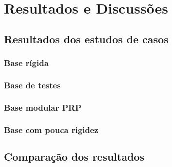 \chapter{Resultados e Discussões}



\section{Resultados dos estudos de casos}

\subsection{Base rígida}

\subsection{Base de testes}

\subsection{Base modular PRP}

\subsection{Base com pouca rigidez}


\section{Comparação dos resultados}